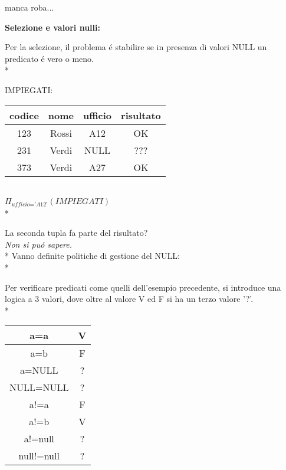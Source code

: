\documentclass[10pt]{report}
\begin{document}
manca roba...

\textbf{Selezione e valori nulli:\\}

Per la selezione, il problema \'e stabilire se in presenza di valori NULL un predicato \'e vero o meno.\\*

IMPIEGATI:
\begin{tabular}{|c|c|c|c|}
\hline 
codice & nome & ufficio & risultato \\ 
\hline 
123 & Rossi & A12 & OK \\ 
\hline 
231 & Verdi & NULL & ??? \\ 
\hline 
373 & Verdi & A27 & OK \\*
\hline 
\end{tabular}
\\
$\Pi _{ \textit{ufficio='A12'} }(\textit{IMPIEGATI})$\\*

La seconda tupla fa parte del risultato?\\
\textit{Non si pu\'o sapere.}\\*
Vanno definite politiche di gestione del NULL:\\*

Per verificare predicati come quelli dell'esempio precedente, si introduce una logica a 3 valori, dove oltre al valore V ed F si ha un terzo valore '?'.\\*

\begin{tabular}{|c|c|}
\hline 
a=a & V \\ 
\hline 
a=b & F \\ 
\hline 
a=NULL & ? \\ 
\hline
NULL=NULL & ? \\
\hline 
a!=a & F \\ 
\hline 
a!=b & V \\ 
\hline 
a!=null & ? \\ 
\hline 
null!=null & ? \\ 
\hline 
\end{tabular} 
\end{document}

